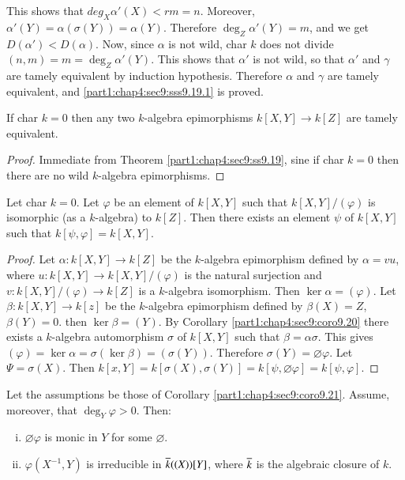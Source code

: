This shows that $deg_X \alpha' (X) < rm =n$. Moreover, $\alpha' (Y)= \alpha(\sigma(Y))= \alpha(Y)$. Therefore $\deg_Z \alpha' (Y)=m$, and we get $D(\alpha')< D(\alpha)$. Now, since $\alpha$ is not wild, char $k$ does not divide \gcd $(n, m)=m= \deg_Z \alpha' (Y)$. This shows that $\alpha'$ is not wild, so that $\alpha'$ and $\gamma$ are tamely equivalent by induction hypothesis. Therefore $\alpha$ and $\gamma$ are tamely equivalent, and \ref{part1:chap4:sec9:sss9.19.1} is proved.  

\setcounter{thm}{19}
\begin{coro}\label{part1:chap4:sec9:coro9.20}
  If char $k=0$ then any two $k$-algebra epimorphisms $k[X, Y] \to k [Z]$ are tamely equivalent.
\end{coro}

\begin{proof}
  Immediate from Theorem \ref{part1:chap4:sec9:ss9.19}, sine if char $k=0$ then there are no wild $k$-algebra epimorphisms.
\end{proof}

\begin{coro}\label{part1:chap4:sec9:coro9.21}
  Let char $k=0$. Let $\varphi$ be an element of $k[X, Y]$ such that $k[X, Y]/(\varphi)$ is isomorphic (as a $k$-algebra) to $k[Z]$. Then there exists an element $\psi$ of $k[X, Y]$ such that $k[\psi, \varphi]= k [X, Y]$.
\end{coro}

\begin{proof}
  Let $\alpha: k[X, Y] \to k [Z]$ be the $k$-algebra epimorphism defined by $\alpha = vu$, where $u: k[X, Y] \to k [X, Y]/(\varphi)$ is the natural surjection and $v: k[X, Y]/(\varphi)\to k[Z]$ is a $k$-algebra isomorphism. Then $\ker \alpha = (\varphi)$. Let $\beta: k[X, Y] \to k [z]$ be the $k$-algebra epimorphism defined by $\beta(X)= Z$,\pageoriginale $\beta(Y)=0$. then $\ker \beta = (Y)$. By Corollary \ref{part1:chap4:sec9:coro9.20} there exists a $k$-algebra automorphism $\sigma$ of $k[X, Y]$ such that $\beta= \alpha \sigma$. This gives $(\varphi)= \ker \alpha = \sigma (\ker \beta) = (\sigma (Y))$. Therefore $\sigma (Y)= \diameter \varphi$. Let $\Psi = \sigma (X)$. Then $k[x, Y] = k [\sigma (X), \sigma(Y)]= k [\psi, \diameter \varphi] = k [\psi, \varphi]$. 
\end{proof}

\begin{lemma}\label{part1:chap4:sec9:lem9.22}
  Let the assumptions be those of Corollary \ref{part1:chap4:sec9:coro9.21}. Assume, moreover, that $\deg_Y \varphi > 0$. Then:
\begin{enumerate}[(i)]
\item $\diameter \varphi$ is monic in $Y$ for some $\diameter$.
\item $\varphi(X^{-1}, Y)$ is irreducible in $\overline{k} ((X))[Y]$, where $\overline{k}$ is the algebraic closure of $k$.
\end{enumerate}
\end{lemma}

